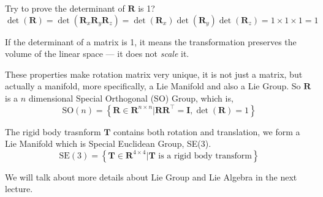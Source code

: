 \documentclass{article}
\begin{document}
Try to prove the determinant of $\mathbf{R}$ is 1?
\begin{equation}
    \det(\mathbf{R}) = \det(\mathbf{R}_x \mathbf{R}_y \mathbf{R}_z) = \det(\mathbf{R}_x) \det(\mathbf{R}_y) \det(\mathbf{R}_z) = 1 \times 1 \times 1 = 1
\end{equation}

If the determinant of a matrix is 1, it means the transformation preserves the volume of the linear space — it does not \textit{scale} it.

These properties make rotation matrix very unique, it is not just a matrix, but actually a manifold, more specifically, a Lie Manifold and also a Lie Group. So $\mathbf{R}$ is a $n$ dimensional Special Orthogonal (SO) Group, which is,
\begin{equation}
    \mathrm{SO}(n) =  
    \left\{ \mathbf{R} \in \mathbb{\mathbf{R}}^{n \times n} \vert \mathbf{R}\mathbf{R}^{\top} = \mathbf{I}, \det(\mathbf{R}) = 1 \right\} 
\end{equation}

The rigid body trasnform $\mathbf{T}$ contains both rotation and translation, we form a Lie Manifold which is Special Euclidean Group, SE(3).
\begin{equation}
    \mathrm{SE}(3) = 
    \left\{ \mathbf{T} \in \mathbb{\mathbf{R}}^{4 \times 4} \vert \mathbf{T} \text{ is a rigid body transform} \right\} 
\end{equation}

We will talk about more details about Lie Group and Lie Algebra in the next lecture.
\end{document}

